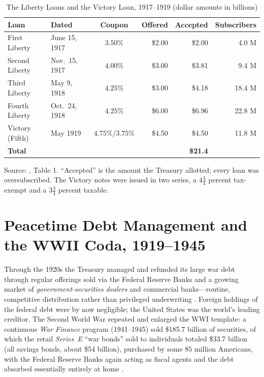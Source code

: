 \documentclass[12pt]{article}
\begin{document}
\begin{table}[htbp]
\centering
\caption{The Liberty Loans and the Victory Loan, 1917--1919 (dollar amounts in
billions)}
\label{tab:liberty}
\small
\begin{tabular}{l l c r r r}
\toprule
Loan & Dated & Coupon & Offered & Accepted & Subscribers \\
\midrule
First Liberty  & June 15, 1917 & $3.50\%$          & \$2.00 & \$2.00 & 4.0 M \\
Second Liberty & Nov.\ 15, 1917 & $4.00\%$          & \$3.00 & \$3.81 & 9.4 M \\
Third Liberty  & May 9, 1918   & $4.25\%$          & \$3.00 & \$4.18 & 18.4 M \\
Fourth Liberty & Oct.\ 24, 1918 & $4.25\%$          & \$6.00 & \$6.96 & 22.8 M \\
Victory (Fifth) & May 1919     & $4.75\%/3.75\%$   & \$4.50 & \$4.50 & 11.8 M \\
\midrule
\textbf{Total} & & & & \textbf{\$21.4} & \\
\bottomrule
\end{tabular}

\smallskip
\footnotesize Source: \citet{kangrockoff2015capitalizing}, Table 1. ``Accepted''
is the amount the Treasury allotted; every loan was oversubscribed. The Victory
notes were issued in two series, a $4\tfrac{3}{4}$ percent tax-exempt and a
$3\tfrac{3}{4}$ percent taxable.
\end{table}

\section{Peacetime Debt Management and the WWII Coda, 1919--1945}

Through the 1920s the Treasury managed and refunded its large war debt through
regular offerings sold via the Federal Reserve Banks and a growing market of
\emph{government-securities dealers} and commercial banks---routine, competitive
distribution rather than privileged underwriting \citep{studenski1963financial,
myers1970financial}. Foreign holdings of the federal debt were by now negligible;
the United States was the world's leading creditor. The Second World War repeated
and enlarged the WWI template: a continuous \emph{War Finance} program
(1941--1945) sold \$185.7 billion of securities, of which the retail
\emph{Series~E} ``war bonds'' sold to individuals totaled \$33.7 billion (all
savings bonds, about \$54 billion), purchased by some $85$ million Americans,
with the Federal Reserve Banks again acting as fiscal agents and the debt
absorbed essentially entirely at home \citep{treasury1945, treasurysavings1984,
bickley2010warbonds}.
\end{document}
